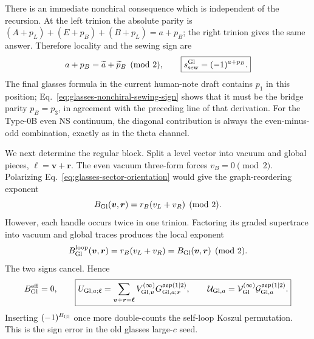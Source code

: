 \documentclass[11pt]{article}
\newcommand{\osp}{\mathfrak{osp}(1|2)}
\newcommand{\G}{\mathcal G}
\newcommand{\V}{\mathcal V}
\newcommand{\U}{\mathcal U}
\begin{document}
There is an immediate nonchiral consequence which is independent of the
recursion.  At the left trinion the absolute parity is
\((A+p_L)+(E+p_B)+(B+p_L)=a+p_B\); the right trinion gives the same answer.
Therefore locality and the sewing sign are
\begin{equation}
 a+p_B=\widetilde a+\widetilde p_B\pmod2,
 \qquad
 \boxed{s_{\rm sew}^{\rm Gl}=(-1)^{a+p_B}.}
 \label{eq:glasses-nonchiral-sewing-sign}
\end{equation}
The final glasses formula in the current human-note draft contains \(p_1\) in
this position; Eq.~\eqref{eq:glasses-nonchiral-sewing-sign} shows that it must
be the bridge parity \(p_B=p_3\), in agreement with the preceding line of that
derivation.  For the Type-0B even NS continuum, the diagonal contribution is
always the even-minus-odd combination, exactly as in the theta channel.

We next determine the regular block.  Split a level vector into vacuum and
global pieces, \(\bm\ell=\bm v+\bm r\).  The even vacuum three-form forces
\(v_B=0\pmod2\).  Polarizing Eq.~\eqref{eq:glasses-sector-orientation} would
give the graph-reordering exponent
\begin{equation}
 B_{\rm Gl}(\bm v,\bm r)=r_B(v_L+v_R)\pmod2.
 \label{eq:glasses-graph-polarization}
\end{equation}
However, each handle occurs twice in one trinion.  Factoring its graded
supertrace into vacuum and global traces produces the local exponent
\begin{equation}
 B_{\rm Gl}^{\rm loop}(\bm v,\bm r)
 =r_B(v_L+v_R)=B_{\rm Gl}(\bm v,\bm r)\pmod2.
 \label{eq:glasses-loop-polarization}
\end{equation}
The two signs cancel.  Hence
\begin{equation}
 B_{\rm Gl}^{\rm eff}=0,
 \qquad
 \boxed{
 U_{{\rm Gl},a;\bm\ell}
 =\sum_{\bm v+\bm r=\bm\ell}
 V_{{\rm Gl},\bm v}^{(\infty)}
 G_{{\rm Gl},a;\bm r}^{\osp},
 \qquad
 \U_{{\rm Gl},a}=\V_{\rm Gl}^{(\infty)}\G_{{\rm Gl},a}^{\osp}.}
 \label{eq:glasses-ordinary-regular-product}
\end{equation}
Inserting \((-1)^{B_{\rm Gl}}\) once more double-counts the self-loop Koszul
permutation.  This is the sign error in the old glasses large-\(c\) seed.
\end{document}
